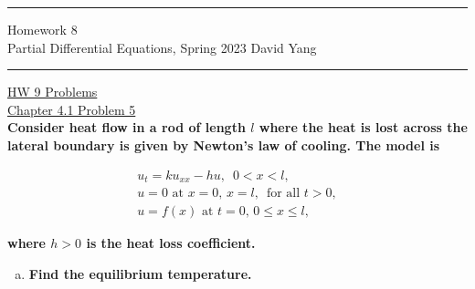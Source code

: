 \documentclass[11pt]{article}
\begin{document}
	\hrule
	\begin{center}
		{\Large Homework 8} \\ %
		\vspace{0.2cm}
		Partial Differential Equations, Spring 2023 \hfill David Yang %
	\end{center}

\hrule

\vspace{1em}


\underline{HW 9 Problems} \\

\underline{Chapter 4.1 Problem 5} \\

\textbf{Consider heat flow in a rod of length $l$ where the heat is lost across the lateral boundary is given by Newton's law of cooling. The model is} 

\[
\begin{array}{c}
    u_t = ku_{xx} - hu, \,\,\, 0 < x < l, \\
    u = 0 \text{ at } x =0, \, x=l, \, \text{ for all } t > 0,\\
    u = f(x) \text { at } t=0, \, 0 \leq x \leq l,
\end{array}
\]

\textbf{where $h > 0$ is the heat loss coefficient.}

\begin{enumerate}[a)]
  \item \textbf{Find the equilibrium temperature.} 
\end{enumerate}
\end{document}
